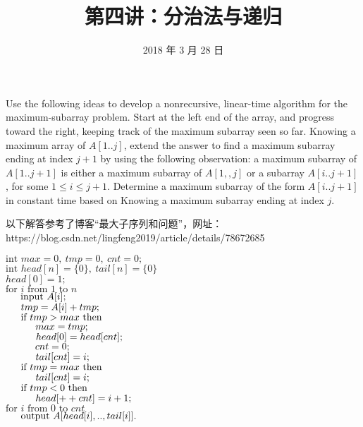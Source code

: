 \documentclass[12pt, a4paper, UTF8]{ctexart}
\title{第四讲：分治法与递归}
\date{2018 年 3 月 28 日}     %
\begin{document}
\maketitle
\noplagiarism	%
\beginthishw	%

\begin{problem}[TC: exercise 4.1-5]	%
  Use the following ideas to develop a nonrecursive, linear-time algorithm 
  for the maximum-subarray problem. Start at the left end of the array, and 
  progress toward the right, keeping track of the maximum subarray seen so 
  far. Knowing a maximum array of $A[1..j]$, extend the answer to find a 
  maximum subarray ending at index $j+1$ by using the following observation: 
  a maximum subarray of $A[1..j + 1]$ is either a maximum subarray of $A[1,,j]$ 
  or a subarray $A[i..j + 1]$, for some $1 \leq i \leq j + 1$. Determine a 
  maximum subarray of the form $A[i..j + 1]$ in constant time based on Knowing 
  a maximum subarray ending at index $j$.
\end{problem}

\begin{remark}	%
  以下解答参考了博客“最大子序列和问题”，网址：\\
  https://blog.csdn.net/lingfeng2019/article/details/78672685
\end{remark}

\begin{solution}
  $\text{int } max = 0,~tmp = 0,~cnt = 0;$\\
  $\text{int } head[n] = \{ 0 \},~tail[n] = \{ 0 \}$\\
  $head[0] = 1;$\\
  $\text{for } i \text{ from } 1 \text{ to } n$\\
  $\indent \text{input } A[i];$\\
  $\indent tmp = A[i] + tmp;$\\
  $\indent \text{if } tmp > max \text{ then}$\\
  $\indent \indent max = tmp;$\\
  $\indent \indent head[0] = head[cnt];$\\
  $\indent \indent cnt = 0;$\\
  $\indent \indent tail[cnt] = i;$\\
  $\indent \text{if } tmp = max \text{ then}$\\
  $\indent \indent tail[cnt] = i;$\\
  $\indent \text{if } tmp < 0 \text{ then}$\\
  $\indent \indent head[++cnt] = i + 1;$\\
  $\text{for } i \text{ from } 0 \text{ to } cnt$\\
  $\indent \text{output } A[head[i],..,tail[i]].$
\end{solution}
\end{document}
